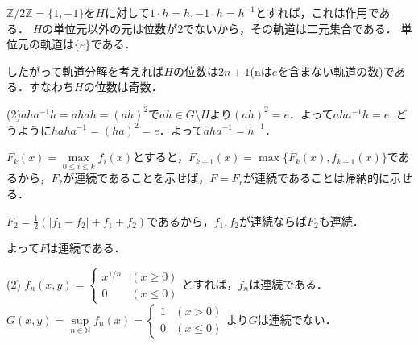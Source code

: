 \documentclass[
		book,
		head_space=20mm,
		foot_space=20mm,
		gutter=10mm,
		line_length=190mm
]{jlreq}
\begin{document}
$\mathbb{Z}/2 \mathbb{Z}=\{1,-1\}$を$H$に対して$1\cdot h=h,-1\cdot h=h^{-1}$とすれば，これは作用である．
$H$の単位元以外の元は位数が2でないから，その軌道は二元集合である．
単位元の軌道は$\{e\}$である．

したがって軌道分解を考えれば$H$の位数は$2n+1$(nは$e$を含まない軌道の数)である．すなわち$H$の位数は奇数．

(2)$aha^{-1}h=ahah=(ah)^2$で$ah \in G\setminus H$より$(ah)^2=e$．よって$aha^{-1}h=e$.
どうように$haha^{-1}=(ha)^2=e$．よって$aha^{-1}=h^{-1}$．

$F_k(x) = \max\limits_{0\leq i \le k}f_i(x)$とすると，$F_{k+1}(x)=\max\{F_k(x),f_{k+1}(x)\}$であるから，$F_2$が連続であることを示せば，$F=F_r$が連続であることは帰納的に示せる．

$F_2=\frac{1}{2}(|f_1-f_2|+f_1+f_2)$であるから，$f_1,f_2$が連続ならば$F_2$も連続．

よって$F$は連続である．

(2) $f_n(x,y)=\begin{cases}
	x^{1/n} & (x\ge 0)\\
	0 & (x\le 0)
\end{cases}
$とすれば，$f_n$は連続である．
$G(x,y)=\sup\limits_{n\in \mathbb{N}}f_n(x)=\begin{cases}
	1 & (x>0)\\
	0 & (x\le 0)
\end{cases}
$より$G$は連続でない．


 
\end{document}
